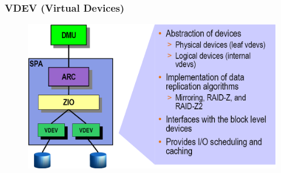 % 
% 
\begin{frame}[fragile]
    \frametitle{VDEV (Virtual Devices)}
    \begin{figure}
    \includegraphics[width=0.8\linewidth]{figs/ZFS-vdev.png}
    \end{figure}
\end{frame}
% 
% 
